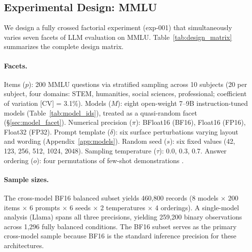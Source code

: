 \subsection{Experimental Design: MMLU}
\label{sec:exp001}

We design a fully crossed factorial experiment (exp-001) that simultaneously varies seven facets of LLM evaluation on MMLU. Table~\ref{tab:design_matrix} summarizes the complete design matrix.

\paragraph{Facets.} Items ($p$): 200 MMLU questions via stratified sampling across 10 subjects (20 per subject, four domains: STEM, humanities, social sciences, professional; coefficient of variation [CV] = 3.1\%). Models ($M$): eight open-weight 7--9B instruction-tuned models (Table~\ref{tab:model_ids}), treated as a quasi-random facet (\S\ref{sec:model_facet}). Numerical precision ($\pi$): BFloat16 (BF16), Float16 (FP16), Float32 (FP32). Prompt template ($\delta$): six surface perturbations \cite{sclar2024formatting} varying layout and wording (Appendix~\ref{app:models}). Random seed ($s$): six fixed values (42, 123, 256, 512, 1024, 2048). Sampling temperature ($\tau$): 0.0, 0.3, 0.7. Answer ordering ($o$): four permutations of few-shot demonstrations \cite{pezeshkpour2024ordering}.

\paragraph{Sample sizes.} The cross-model BF16 balanced subset yields 460,800 records (8 models $\times$ 200 items $\times$ 6 prompts $\times$ 6 seeds $\times$ 2 temperatures $\times$ 4 orderings). A single-model analysis (Llama) spans all three precisions, yielding 259,200 binary observations across 1,296 fully balanced conditions. The BF16 subset serves as the primary cross-model sample because BF16 is the standard inference precision for these architectures.

